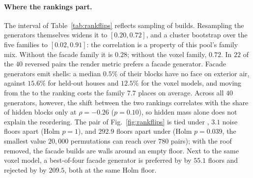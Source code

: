 \begin{table}[h]
\centering
\small
\setlength{\tabcolsep}{4pt}
\caption{\textbf{Agreement of the two rankings over real generators.} Spearman correlation
of the \mvkid{} and \vkid{} orderings with a half-sampling $95\%$ interval. Pairs: separated
by both metrics under the exact permutation test after Holm correction over all $780$, and
the subset the two metrics order oppositely.}
\label{tab:rankflips}
\end{table}

\paragraph{Where the rankings part.} The interval of Table~\ref{tab:rankflips} reflects
sampling of builds. Resampling the generators themselves widens it to $[0.20, 0.72]$, and a
cluster bootstrap over the five families to $[0.02, 0.91]$: the correlation is a property of
this pool's family mix. Without the facade family it is $0.28$; without the voxel family,
$0.72$. In $22$ of the $40$ reversed pairs the render metric prefers a facade generator.
Facade generators emit shells: a median $0.5\%$ of their blocks have no face on exterior air,
against $15.6\%$ for held-out houses and $12.5\%$ for the voxel models, and moving from the
\mvkid{} to the \vkid{} ranking costs the family $7.7$ places on average. Across all $40$
generators, however, the shift between the two rankings correlates with the share of hidden
blocks only at $\rho{=}-0.26$ ($p{=}0.10$), so hidden mass alone does not explain the
reordering. The pair of Fig.~\ref{fig:rankflips} is tied under \mvkid{}, $3.1$ noise floors
apart (Holm $p{=}1$), and $292.9$ floors apart under \vkid{} (Holm $p{=}0.039$, the smallest
value $20{,}000$ permutations can reach over $780$ pairs); with the roof removed, the facade
builds are walls around an empty floor. Next to the same voxel model, a best-of-four facade
generator is preferred by \mvkid{} by $55.1$ floors and rejected by \vkid{} by $209.5$, both
at the same Holm floor.

